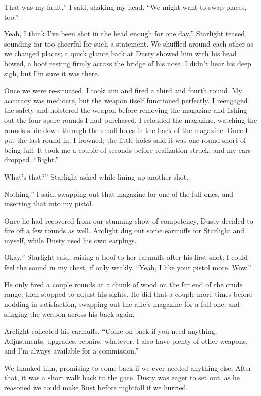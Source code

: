 \leavevmode{}That was my fault,” I said, shaking my head. “We might want to swap places, too.”

\leavevmode{}Yeah, I think I’ve been shot in the head enough for one day,” Starlight teased, sounding far too cheerful for such a statement. We shuffled around each other as we changed places; a quick glance back at Dusty showed him with his head bowed, a hoof resting firmly across the bridge of his nose. I didn’t hear his deep sigh, but I’m sure it was there.

Once we were re-situated, I took aim and fired a third and fourth round. My accuracy was mediocre, but the weapon itself functioned perfectly. I reengaged the safety and holstered the weapon before removing the magazine and fishing out the four spare rounds I had purchased. I reloaded the magazine, watching the rounds slide down through the small holes in the back of the magazine. Once I put the last round in, I frowned; the little holes said it was one round short of being full. It took me a couple of seconds before realization struck, and my ears dropped. “Right.”

\leavevmode{}What’s that?” Starlight asked while lining up another shot.

\leavevmode{}Nothing,” I said, swapping out that magazine for one of the full ones, and inserting that into my pistol.

Once he had recovered from our stunning show of competency, Dusty decided to fire off a few rounds as well. Arclight dug out some earmuffs for Starlight and myself, while Dusty used his own earplugs.

\leavevmode{}Okay,” Starlight said, raising a hoof to her earmuffs after his first shot; I could feel the sound in my chest, if only weakly. “Yeah, I like your pistol more. Wow.”

He only fired a couple rounds at a chunk of wood on the far end of the crude range, then stopped to adjust his sights. He did that a couple more times before nodding in satisfaction, swapping out the rifle’s magazine for a full one, and slinging the weapon across his back again.

Arclight collected his earmuffs. “Come on back if you need anything. Adjustments, upgrades, repairs, whatever. I also have plenty of other weapons, and I’m always available for a commission.”

We thanked him, promising to come back if we ever needed anything else. After that, it was a short walk back to the gate. Dusty was eager to set out, as he reasoned we could make Rust before nightfall if we hurried.

